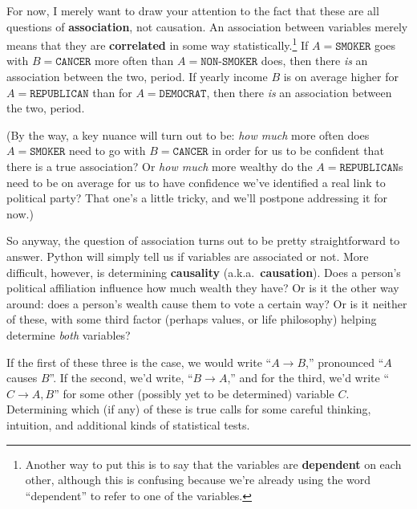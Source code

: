 
For now, I merely want to draw your attention to the fact that these are all
questions of \textbf{association}, not causation. An association between
variables merely means that they are \textbf{correlated} in some way
statistically.\footnote{Another way to put this is to say that the variables
are \textbf{dependent} on each other, although this is confusing because we're
already using the word ``dependent'' to refer to one of the variables.} If
$A=\texttt{SMOKER}$ goes with $B=\texttt{CANCER}$ more often than
$A=\texttt{NON-SMOKER}$ does, then there \textit{is} an association between the
two, period. If yearly income $B$ is on average higher for
$A=\texttt{REPUBLICAN}$ than for $A=\texttt{DEMOCRAT}$, then there \textit{is}
an association between the two, period.

\label{howMuchMore}

(By the way, a key nuance will turn out to be: \textit{how much} more often
does $A=\texttt{SMOKER}$ need to go with $B=\texttt{CANCER}$ in order for us to
be confident that there is a true association? Or \textit{how much} more
wealthy do the $A=\texttt{REPUBLICAN}$s need to be on average for us to have
confidence we've identified a real link to political party? That one's a little
tricky, and we'll postpone addressing it for now.)

\label{pythonAssociation}

So anyway, the question of association turns out to be pretty straightforward
to answer. Python will simply tell us if variables are associated or not. More
difficult, however, is determining \textbf{causality}
(a.k.a.~\textbf{causation}). Does a person's political affiliation influence
how much wealth they have? Or is it the other way around: does a person's
wealth cause them to vote a certain way? Or is it neither of these, with some
third factor (perhaps values, or life philosophy) helping determine
\textit{both} variables?


If the first of these three is the case, we would write ``$A \rightarrow B$,''
pronounced ``$A$ causes $B$''. If the second, we'd write, ``$B \rightarrow
A$,'' and for the third, we'd write ``$C \rightarrow A, B$'' for some other
(possibly yet to be determined) variable $C$. Determining which (if any) of
these is true calls for some careful thinking, intuition, and additional kinds
of statistical tests.

